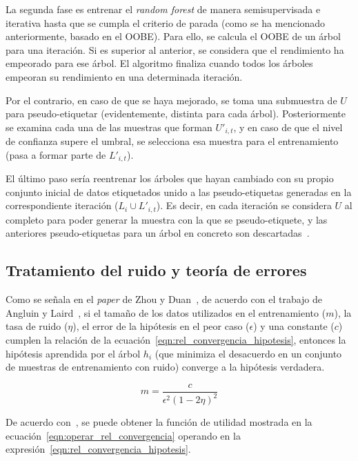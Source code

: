 La segunda fase es entrenar el \textit{random forest} de manera semisupervisada e iterativa hasta que se cumpla el criterio de parada (como se ha mencionado anteriormente, basado en el OOBE). Para ello, se calcula el OOBE de un árbol para una iteración. Si es superior al anterior, se considera que el rendimiento ha empeorado para ese árbol. El algoritmo finaliza cuando todos los árboles empeoran su rendimiento en una determinada iteración.

Por el contrario, en caso de que se haya mejorado, se toma una submuestra de $U$ para pseudo-etiquetar (evidentemente, distinta para cada árbol). Posteriormente se examina cada una de las muestras que forman $U'_{i, t}$, y en caso de que el nivel de confianza supere el umbral, se selecciona esa muestra para el entrenamiento (pasa a formar parte de $L'_{i, t}$).

El último paso sería reentrenar los árboles que hayan cambiado con su propio conjunto inicial de datos etiquetados unido a las pseudo-etiquetas generadas en la correspondiente iteración ($L_{i}\cup L'_{i,t}$). Es decir, en cada iteración se considera $U$ al completo para poder generar la muestra con la que se pseudo-etiquete, y las anteriores pseudo-etiquetas para un árbol en concreto son descartadas~\cite{engelen2018thesis}.


\subsection{Tratamiento del ruido y teoría de errores}

Como se señala en el \textit{paper} de Zhou y Duan~\cite{zhou2021SemisupervisedRecommendationAttack}, de acuerdo con el trabajo de Angluin y Laird~\cite{noisyExamplesCoforest1988Dana}, si el tamaño de los datos utilizados en el entrenamiento ($m$), la tasa de ruido ($\eta$), el error de la hipótesis en el peor caso ($\epsilon$) y una constante ($c$) cumplen la relación de la ecuación~\ref{eqn:rel_convergencia_hipotesis}, entonces la hipótesis aprendida por el árbol $h_{i}$ (que minimiza el desacuerdo en un conjunto de muestras de entrenamiento con ruido) converge a la hipótesis verdadera.

\begin{equation}\label{eqn:rel_convergencia_hipotesis} m = \frac{c}{\epsilon^{2}(1-2\eta)^{2}} \end{equation} 

De acuerdo con~\cite{zhou2021SemisupervisedRecommendationAttack}, se puede obtener la función de utilidad mostrada en la ecuación~\ref{eqn:operar_rel_convergencia} operando en la expresión~\ref{eqn:rel_convergencia_hipotesis}.

